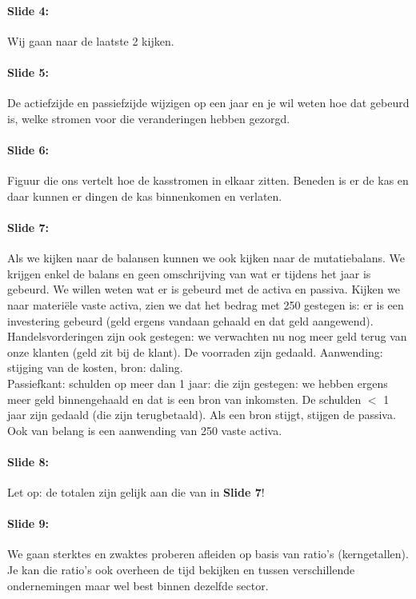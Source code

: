 \documentclass[10pt,a4paper]{report}
\begin{document}
\paragraph{Slide 4:} Wij gaan naar de laatste 2 kijken.

\paragraph{Slide 5:} De actiefzijde en passiefzijde wijzigen op een jaar en je wil weten hoe dat gebeurd is, welke stromen voor die veranderingen hebben gezorgd.

\paragraph{Slide 6:} Figuur die ons vertelt hoe de kasstromen in elkaar zitten. Beneden is er de kas en daar kunnen er dingen de kas binnenkomen en verlaten.

\paragraph{Slide 7:} Als we kijken naar de balansen kunnen we ook kijken naar de mutatiebalans. We krijgen enkel de balans en geen omschrijving van wat er tijdens het jaar is gebeurd. We willen weten wat er is gebeurd met de activa en passiva. Kijken we naar materi\"ele vaste activa, zien we dat het bedrag met 250 gestegen is: er is een investering gebeurd (geld ergens vandaan gehaald en dat geld aangewend). Handelsvorderingen zijn ook gestegen: we verwachten nu nog meer geld terug van onze klanten (geld zit bij de klant). De voorraden zijn gedaald. Aanwending: stijging van de kosten, bron: daling.\\
Passiefkant: schulden op meer dan 1 jaar: die zijn gestegen: we hebben ergens meer geld binnengehaald en dat is een bron van inkomsten. De schulden $<$ 1 jaar zijn gedaald (die zijn terugbetaald). Als een bron stijgt, stijgen de passiva.\\
Ook van belang is een aanwending van 250 vaste activa.

\paragraph{Slide 8:} Let op: de totalen zijn gelijk aan die van in \textbf{Slide 7}!

\paragraph{Slide 9:} We gaan sterktes en zwaktes proberen afleiden op basis van ratio's (kerngetallen). Je kan die ratio's ook overheen de tijd bekijken en tussen verschillende ondernemingen maar wel best binnen dezelfde sector.
\end{document}
